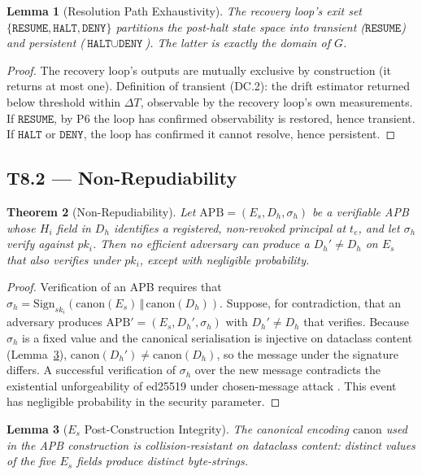 \documentclass[11pt]{article}
\newtheorem{theorem}{Theorem}[section]
\newtheorem{lemma}[theorem]{Lemma}
\newcommand{\HALT}{\texttt{HALT}}
\newcommand{\RESUME}{\texttt{RESUME}}
\newcommand{\DENY}{\texttt{DENY}}
\newcommand{\Es}{E_s}
\newcommand{\Dh}{D_h}
\newcommand{\sigh}{\sigma_h}
\newcommand{\Hi}{H_i}
\newcommand{\ski}{sk_i}
\newcommand{\pki}{pk_i}
\newcommand{\APB}{\mathrm{APB}}
\begin{document}
\begin{lemma}[Resolution Path Exhaustivity]
\label{lem:exhaustivity}
The recovery loop's exit set $\{\RESUME, \HALT, \DENY\}$ partitions
the post-halt state space into transient ($\RESUME$) and
persistent ($\HALT \cup \DENY$). The latter is exactly the
domain of $G$.
\end{lemma}

\begin{proof}
The recovery loop's outputs are mutually exclusive by construction
(it returns at most one). Definition of transient (DC.2): the drift
estimator returned below threshold within $\Delta T$, observable by
the recovery loop's own measurements. If $\RESUME$, by P6 the loop
has confirmed observability is restored, hence transient. If $\HALT$
or $\DENY$, the loop has confirmed it cannot resolve, hence
persistent.
\end{proof}

\subsection{T8.2 --- Non-Repudiability}
\label{sec:t82}

\begin{theorem}[Non-Repudiability]
\label{thm:nonrep}
Let $\APB = (\Es, \Dh, \sigh)$ be a verifiable APB whose $\Hi$ field
in $\Dh$ identifies a registered, non-revoked principal at $t_e$, and
let $\sigh$ verify against $\pki$. Then no efficient adversary can
produce a $\Dh' \neq \Dh$ on $\Es$ that also verifies under $\pki$,
except with negligible probability.
\end{theorem}

\begin{proof}
Verification of an APB requires that
$\sigh = \mathrm{Sign}_{\ski}(\mathrm{canon}(\Es) \,\Vert\,
\mathrm{canon}(\Dh))$. Suppose, for contradiction, that an adversary
produces $\APB' = (\Es, \Dh', \sigh)$ with $\Dh' \neq \Dh$ that
verifies. Because $\sigh$ is a fixed value and the canonical
serialisation is injective on dataclass content (Lemma~\ref{lem:integrity}),
$\mathrm{canon}(\Dh') \neq \mathrm{canon}(\Dh)$, so the message under
the signature differs. A successful verification of $\sigh$ over the
new message contradicts the existential unforgeability of ed25519
under chosen-message attack
\citep{bernstein2012highspeed,boneh2014foundations}. This event has
negligible probability in the security parameter.
\end{proof}

\begin{lemma}[$\Es$ Post-Construction Integrity]
\label{lem:integrity}
The canonical encoding $\mathrm{canon}$ used in the APB construction
is collision-resistant on dataclass content: distinct values of the
five $\Es$ fields produce distinct byte-strings.
\end{lemma}
\end{document}
